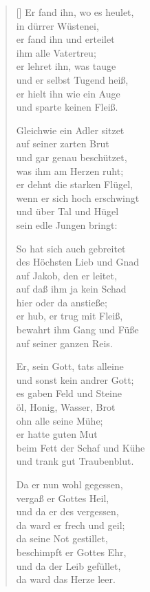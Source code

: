 \begin{multicols}{2}
\begin{verse}[\versewidth]
 Er fand ihn, wo es heulet,\\
in dürrer Wüstenei,\\
er fand ihn und erteilet\\
ihm alle Vatertreu;\\
er lehret ihn, was tauge\\
und er selbst Tugend heiß,\\
er hielt ihn wie ein Auge\\
und sparte keinen Fleiß.

 Gleichwie ein Adler sitzet\\
auf seiner zarten Brut\\
und gar genau beschützet,\\
was ihm am Herzen ruht;\\
er dehnt die starken Flügel,\\
wenn er sich hoch erschwingt\\
und über Tal und Hügel\\
sein edle Jungen bringt:

 So hat sich auch gebreitet\\
des Höchsten Lieb und Gnad\\
auf Jakob, den er leitet,\\
auf daß ihm ja kein Schad\\
hier oder da anstieße;\\
er hub, er trug mit Fleiß,\\
bewahrt ihm Gang und Füße\\
auf seiner ganzen Reis.

 Er, sein Gott, tats alleine\\
und sonst kein andrer Gott;\\
es gaben Feld und Steine\\
öl, Honig, Wasser, Brot\\
ohn alle seine Mühe;\\
er hatte guten Mut\\
beim Fett der Schaf und Kühe\\
und trank gut Traubenblut.

 Da er nun wohl gegessen,\\
vergaß er Gottes Heil,\\
und da er des vergessen,\\
da ward er frech und geil;\\
da seine Not gestillet,\\
beschimpft er Gottes Ehr,\\
und da der Leib gefüllet,\\
da ward das Herze leer.


\end{verse}
\end{multicols}
